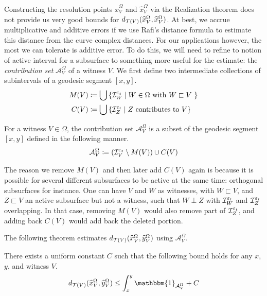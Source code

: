 \documentclass[12pt, reqno]{amsart}
\begin{document}
Constructing the resolution points $\widehat{x}_V^{\Omega}$ and $\widehat{x}_V^{\Omega}$ via the Realization theorem does not provide us very good bounds for $d_{\mathcal{T}(V)}(\widehat{x}_V^{\Omega}, \widehat{x}_V^{\Omega})$.
At best, we accrue multiplicative and additive errors if we use Rafi's distance formula to estimate this distance from the curve complex distances.
For our applications however, the most we can tolerate is additive error.
To do this, we will need to refine to notion of active interval for a subsurface to something more useful for the estimate: the \emph{contribution set} $\mathcal{A}_V^{\Omega}$ of a witness $V$.
We first define two intermediate collections of subintervals of a geodesic segment $[x,y]$.
\begin{align*}
  M(V) &\coloneqq \bigcup \left\{ \mathcal{I}_W^{{\varepsilon_t}} \mid \text{$W \in \Omega$ with $W \sqsubset V$ }  \right\} \\
  C(V) &\coloneqq \bigcup \left\{ \mathcal{I}_Z^{{\varepsilon_t}} \mid \text{$Z$ contributes to $V$} \right\}
\end{align*}

\begin{definition}
  For a witness $V \in \Omega$, the contribution set $\mathcal{A}_V^{\Omega}$ is a subset of the geodesic segment $[x,y]$ defined in the following manner.
  \begin{align*}
    \mathcal{A}_V^{\Omega} \coloneqq \left( \mathcal{I}_V^{\varepsilon_t} \setminus M(V) \right) \cup C(V)
  \end{align*}
\end{definition}
\begin{rem}
  The reason we remove $M(V)$ and then later add $C(V)$ again is because it is possible for several different subsurfaces to be active at the same time: orthogonal subsurfaces for instance.
  One can have $V$ and $W$ as witnesses, with $W \sqsubset V$, and $Z \sqsubset V$ an active subsurface but not a witness, such that $W \perp Z$ with $\mathcal{I}_W^{\varepsilon_t}$ and $\mathcal{I}_Z^{\varepsilon_t}$ overlapping.
  In that case, removing $M(V)$ would also remove part of $\mathcal{I}_Z^{\varepsilon_t}$, and adding back $C(V)$ would add back the deleted portion.
\end{rem}

The following theorem estimates $d_{\mathcal{T}(V)}(\widehat{x}_V^{\Omega}, \widehat{y}_V^{\Omega})$ using $\mathcal{A}_V^{\Omega}$.
\begin{theorem}
  \label{thm:contribution-set-resolution-distance}
  There exists a uniform constant $C$ such that the following bound holds for any $x$, $y$, and witness $V$.
  \begin{align*}
d_{\teich(V)}(\widehat{x}_V^{\Omega}, \widehat{y}_V^{\Omega}) \leq \int_x^y \mathbbm{1}_{\mathcal{A}_V^{\Omega}} + C
  \end{align*}
\end{theorem}
\end{document}
